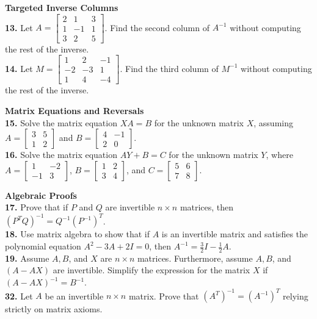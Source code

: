 \documentclass{article}
\begin{document}
\vspace{10pt}
\noindent
\textbf{Targeted Inverse Columns} \\
\textbf{13.} Let $A = \begin{bmatrix} 2 & 1 & 3 \\ 1 & -1 & 1 \\ 3 & 2 & 5 \end{bmatrix}$. Find the second column of $A^{-1}$ without computing the rest of the inverse. \\
\textbf{14.} Let $M = \begin{bmatrix} 1 & 2 & -1 \\ -2 & -3 & 1 \\ 1 & 4 & -4 \end{bmatrix}$. Find the third column of $M^{-1}$ without computing the rest of the inverse. 

\vspace{10pt}
\noindent
\textbf{Matrix Equations and Reversals} \\
\textbf{15.} Solve the matrix equation $XA = B$ for the unknown matrix $X$, assuming $A = \begin{bmatrix} 3 & 5 \\ 1 & 2 \end{bmatrix}$ and $B = \begin{bmatrix} 4 & -1 \\ 2 & 0 \end{bmatrix}$. \\
\textbf{16.} Solve the matrix equation $AY + B = C$ for the unknown matrix $Y$, where $A = \begin{bmatrix} 1 & -2 \\ -1 & 3 \end{bmatrix}$, $B = \begin{bmatrix} 1 & 2 \\ 3 & 4 \end{bmatrix}$, and $C = \begin{bmatrix} 5 & 6 \\ 7 & 8 \end{bmatrix}$. 

\vspace{10pt}
\noindent
\textbf{Algebraic Proofs} \\
\textbf{17.} Prove that if $P$ and $Q$ are invertible $n \times n$ matrices, then $(P^T Q)^{-1} = Q^{-1} (P^{-1})^T$. \\
\textbf{18.} Use matrix algebra to show that if $A$ is an invertible matrix and satisfies the polynomial equation $A^2 - 3A + 2I = 0$, then $A^{-1} = \frac{3}{2}I - \frac{1}{2}A$. \\
\textbf{19.} Assume $A, B$, and $X$ are $n \times n$ matrices. Furthermore, assume $A, B$, and $(A - AX)$ are invertible. Simplify the expression for the matrix $X$ if $(A - AX)^{-1} = B^{-1}$. \\
\textbf{32.} Let $A$ be an invertible $n \times n$ matrix. Prove that $(A^T)^{-1} = (A^{-1})^T$ relying strictly on matrix axioms. 
\end{document}
